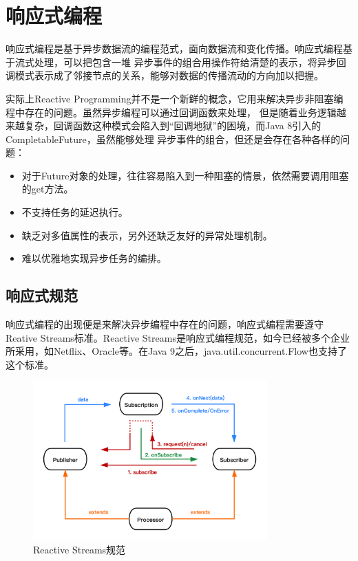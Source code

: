 \documentclass[master]{njuthesis}
\begin{document}
\section{响应式编程}\label{reactive_programming}
响应式编程是基于异步数据流的编程范式，面向数据流和变化传播。响应式编程基于流式处理，可以把包含一堆
异步事件的组合用操作符给清楚的表示，将异步回调模式表示成了邻接节点的关系，能够对数据的传播流动的方向加以把握。

实际上Reactive Programming并不是一个新鲜的概念，它用来解决异步非阻塞编程中存在的问题。虽然异步编程可以通过回调函数来处理，
但是随着业务逻辑越来越复杂，回调函数这种模式会陷入到“回调地狱”的困境，而Java 8引入的CompletableFuture，虽然能够处理
异步事件的组合，但还是会存在各种各样的问题\cite{7203125}：
\begin{itemize}
  \item 对于Future对象的处理，往往容易陷入到一种阻塞的情景，依然需要调用阻塞的get方法。
  \item 不支持任务的延迟执行。
  \item 缺乏对多值属性的表示，另外还缺乏友好的异常处理机制。
  \item 难以优雅地实现异步任务的编排。
\end{itemize}


\subsection{响应式规范}
响应式编程的出现便是来解决异步编程中存在的问题，响应式编程需要遵守Reative Streams\cite{satyanarayan2015reactive}标准。Reactive Streams是响应式编程规范，如今已经被多个企业所采用，如Netflix、Oracle等。在Java 9之后，java.util.concurrent.Flow也支持了这个标准。

\begin{figure}[htbp]
\centering
\includegraphics[width= 0.8\textwidth]{pic/reactive-streams.png}
\caption{Reactive Streams规范}\label{fig:reactive-stream}
\end{figure}
\end{document}
